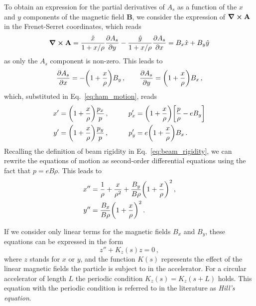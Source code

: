 To obtain an expression for the partial derivatives of $A_s$ as a function of the $x$ and $y$ components of the magnetic field $\mathbf{B}$, we consider the expression of $\curl \mathbf{A}$ in the Frenet-Serret coordinates, which reads
%
\begin{equation}
    \curl \mathbf{A} = \frac{\hat x}{1+x/\rho}\pdv{A_s}{y} - \frac{\hat y}{1+x/\rho}\pdv{A_s}{x} = B_x\hat x + B_y\hat y %
\end{equation}
%
as only the $A_s$ component is non-zero. This leads to
%
\begin{equation}
    \pdv{A_s}{x} = -\qty(1+\frac{x}{\rho})B_y\,, \qquad \pdv{A_s}{y} = \qty(1+\frac{x}{\rho})B_x\,,
\end{equation}
%
which, substituted in Eq.~\eqref{eq:ham_motion}, reads
%
\begin{equation} 
    \begin{aligned}
        x' &= \qty(1+\frac{x}{\rho})\frac{p_x}{p}\,, &\qquad p'_x &= \qty(1+\frac{x}{\rho})\qty[ \frac{p}{\rho} - eB_y]\\
        y' &= \qty(1+\frac{x}{\rho})\frac{p_y}{p}\,, &\qquad p'_y &= e\qty(1+\frac{x}{\rho})B_x\,.
    \end{aligned}
\end{equation}
%
Recalling the definition of beam rigidity in Eq.~\eqref{eq:beam_rigidity}, we can rewrite the equations of motion as second-order differential equations using the fact that $p=eB\rho$. This leads to
%
\begin{equation}
    \begin{split}
        x'' &= \frac{1}{\rho} + \frac{x}{\rho^2} + \frac{B_y}{B\rho}\qty(1+\frac{x}{\rho})^2\,,\\
        y'' &= \frac{B_x}{B\rho}\qty(1+\frac{x}{\rho})^2\,.
    \end{split}
    \label{eq:acc_step_1}
\end{equation} 

If we consider only linear terms for the magnetic fields $B_x$ and $B_y$, these equations can be expressed in the form 
\begin{equation}
	z''+K_z(s)z = 0\, ,
    \label{eq:acc_step_2}
\end{equation}
where $z$ stands for $x$ or $y$, and the function $K(s)$ represents the effect of the linear magnetic fields the particle is subject to in the accelerator.  For a circular accelerator of length $L$ the periodic condition $K_z(s)=K_z(s+L)$ holds. This equation with the periodic condition is referred to in the literature as \textit{Hill's equation}.



